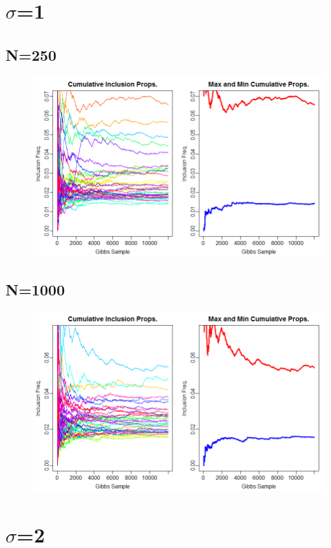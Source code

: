 \documentclass[12pt]{article}
\begin{document}
\section{$\sigma$=1}
\subsection*{N=250}
\begin{figure}[H]
\centerline{\includegraphics[scale=.52]{sq1_n250}}
\end{figure}

\subsection*{N=1000}
\begin{figure}[H]
\centerline{\includegraphics[scale=.52]{sq1_n1000}}

\end{figure}

\section{$\sigma$=2}
\end{document}
